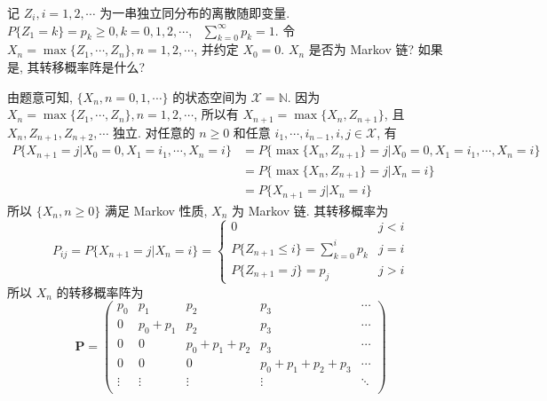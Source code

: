 \documentclass[boxes]{homework}
\begin{document}
\begin{problem}
记 $Z_i, i = 1, 2, \cdots$ 为一串独立同分布的离散随即变量. $P\{Z_1 = k\} = p_k \ge 0, k = 0, 1, 2, \cdots$, \
$\displaystyle \sum_{k = 0}^\infty p_k = 1$. 令 $X_n = \max\{Z_1, \cdots, Z_n\}, n = 1,
    2, \cdots$, 并约定 $X_0 = 0$. $X_n$ 是否为 Markov 链? 如果是, 其转移概率阵是什么?
\end{problem}
\begin{solution}
    由题意可知, $\{X_n, n = 0, 1, \cdots\}$ 的状态空间为 $\mathcal{X} = \mathbb{N}$. 因为
    $X_n = \max\{Z_1, \cdots, Z_n\}, n = 1, 2, \cdots$, 所以有 $X_{n + 1} = \max\{X_n, Z_{n + 1}\}$,
    且 $X_n, Z_{n + 1}, Z_{n + 2}, \cdots$ 独立. 对任意的 $n \ge 0$ 和任意
    $i_1, \cdots, i_{n - 1}, i, j \in \mathcal{X}$, 有
    \begin{equation}
        \begin{aligned}
            P\{X_{n + 1} = j \vert X_0 = 0, X_1 = i_1, \cdots, X_n = i\}
             & = P\{\max\{X_n, Z_{n + 1}\} = j \vert X_0 = 0, X_1 = i_1, \cdots, X_n = i\} \\
             & = P\{\max\{X_n, Z_{n + 1}\} = j \vert X_n = i\}                             \\
             & = P\{X_{n + 1} = j \vert X_n = i\}
        \end{aligned}
    \end{equation}
    所以 $\{X_n, n \ge 0\}$ 满足 Markov 性质, $X_n$ 为 Markov 链. 其转移概率为
    \begin{equation}
        P_{ij} = P\{X_{n + 1} = j \vert X_n = i \} = \begin{cases}
            0                                         & j < i \\
            P\{Z_{n + 1} \le i\} = \sum_{k = 0}^i p_k & j = i \\
            P\{Z_{n + 1} = j\} = p_j                  & j > i
        \end{cases}
    \end{equation}
    所以 $X_n$ 的转移概率阵为
    \begin{equation}
        \boldsymbol{P} = \begin{pmatrix}
            p_0    & p_1       & p_2             & p_3                   & \cdots \\
            0      & p_0 + p_1 & p_2             & p_3                   & \cdots \\
            0      & 0         & p_0 + p_1 + p_2 & p_3                   & \cdots \\
            0      & 0         & 0               & p_0 + p_1 + p_2 + p_3 & \cdots \\
            \vdots & \vdots    & \vdots          & \vdots                & \ddots \\
        \end{pmatrix}
    \end{equation}
\end{solution}
\end{document}
